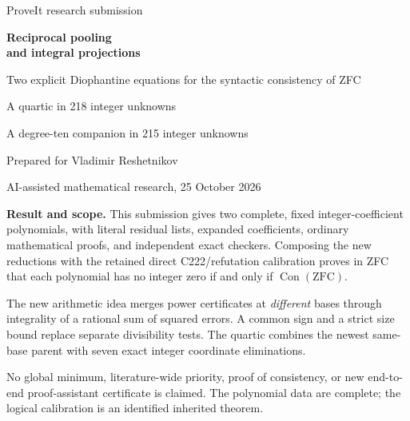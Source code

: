 \documentclass[11pt,letterpaper]{article}
\theoremstyle{definition}\newtheorem{definition}[theorem]{Definition}
\theoremstyle{remark}\newtheorem{remark}[theorem]{Remark}
\newcommand{\Con}{\operatorname{Con}}
\newcommand{\ZFC}{\mathrm{ZFC}}
\begin{document}
\begin{titlepage}
\vspace*{0.65in}
{\color{blue!45!black}\Large ProveIt research submission\par}
\vspace{0.35in}
{\Huge\bfseries Reciprocal pooling\\[8pt]and integral projections\par}
\vspace{0.25in}
{\Large Two explicit Diophantine equations for the syntactic consistency of ZFC\par}
\vspace{0.45in}
{\large A quartic in 218 integer unknowns\par}
{\large A degree-ten companion in 215 integer unknowns\par}
\vspace{0.6in}
Prepared for Vladimir Reshetnikov\par
AI-assisted mathematical research, 25 October 2026\par
\vfill
\begin{minipage}{0.96\textwidth}
\textbf{Result and scope.} This submission gives two complete, fixed
integer-coefficient polynomials, with literal residual lists, expanded
coefficients, ordinary mathematical proofs, and independent exact checkers.
Composing the new reductions with the retained direct C222/refutation
calibration proves in ZFC that each polynomial has no integer zero if and
only if $\Con(\ZFC)$.

The new arithmetic idea merges power certificates at \emph{different}
bases through integrality of a rational sum of squared errors. A common
sign and a strict size bound replace separate divisibility tests. The
quartic combines the newest same-base parent with seven exact integer
coordinate eliminations.

No global minimum, literature-wide priority, proof of consistency, or new
end-to-end proof-assistant certificate is claimed. The polynomial data
are complete; the logical calibration is an identified inherited theorem.
\end{minipage}
\end{titlepage}
\end{document}
